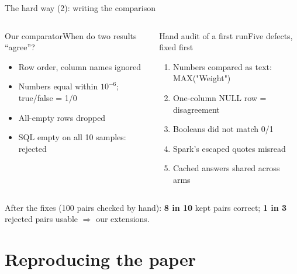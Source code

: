 \documentclass[11pt,aspectratio=169]{beamer}
\newcommand{\code}[1]{{\ttfamily\scriptsize #1}}
\begin{document}
\begin{frame}{The hard way (2): writing the comparison}
\vspace{0.05cm}
\begin{columns}[T]
\begin{tscard}[tsnavy]{Our comparator}{When do two results ``agree''?}
\begin{itemize}\footnotesize\setlength{\itemsep}{0pt}
\item Row order, column names ignored
\item Numbers equal within $10^{-6}$; true/false = 1/0
\item All-empty rows dropped
\item SQL empty on all 10 samples: rejected
\end{itemize}
\end{tscard}
\begin{tscard}[tsred]{Hand audit of a first run}{Five defects, fixed first}
\begin{enumerate}\footnotesize\setlength{\itemsep}{0pt}
\item Numbers compared as text: \code{MAX("Weight")}
\item One-column NULL row = disagreement
\item Booleans did not match 0/1
\item Spark's escaped quotes misread
\item Cached answers shared across arms
\end{enumerate}
\end{tscard}
\end{columns}
\vspace{0.2cm}
\begin{tscallout}[tspink]\small After the fixes (100 pairs checked by hand): \textbf{8 in 10} kept pairs correct; \textbf{1 in 3} rejected pairs usable $\Rightarrow$ our extensions.\end{tscallout}
\end{frame}

\section{Reproducing the paper}
\end{document}

